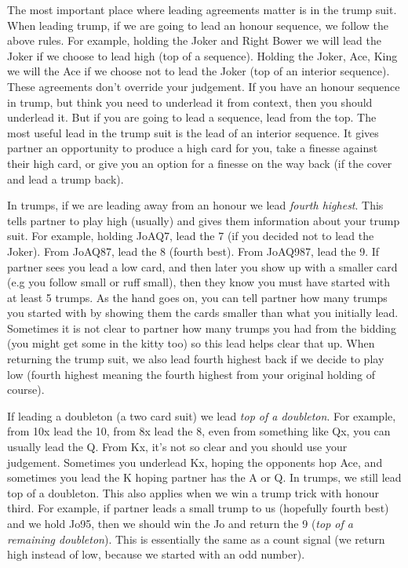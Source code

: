\documentclass[a4paper]{report}
\theoremstyle{question}
\theoremstyle{theorem}
\theoremstyle{definition}
\newcommand{\<}{\left\langle}%
\renewcommand{\>}{\right\rangle}%
\begin{document}
The most important place where leading agreements matter is in the trump suit. When leading trump, if we are going to lead an honour sequence, we follow the above rules. For example, holding the Joker and Right Bower we will lead the Joker if we choose to lead high (top of a sequence). Holding the Joker, Ace, King we will the Ace if we choose not to lead the Joker (top of an interior sequence). These agreements don't override your judgement. If you have an honour sequence in trump, but think you need to underlead it from context, then you should underlead it. But if you are going to lead a sequence, lead from the top. The most useful lead in the trump suit is the lead of an interior sequence. It gives partner an opportunity to produce a high card for you, take a finesse against their high card, or give you an option for a finesse on the way back (if the cover and lead a trump back).


In trumps, if we are leading away from an honour we lead \textit{fourth highest}. This tells partner to play high (usually) and gives them information about your trump suit. For example, holding JoAQ7, lead the 7 (if you decided not to lead the Joker). From JoAQ87, lead the 8 (fourth best). From JoAQ987, lead the 9. If partner sees you lead a low card, and then later you show up with a smaller card (e.g you follow small or ruff small), then they know you must have started with at least 5 trumps. As the hand goes on, you can tell partner how many trumps you started with by showing them the cards smaller than what you initially lead. Sometimes it is not clear to partner how many trumps you had from the bidding (you might get some in the kitty too) so this lead helps clear that up. When returning the trump suit, we also lead fourth highest back if we decide to play low (fourth highest meaning the fourth highest from your original holding of course).

If leading a doubleton (a two card suit) we lead \textit{top of a doubleton}. For example, from 10x lead the 10, from 8x lead the 8, even from something like Qx, you can usually lead the Q. From Kx, it's not so clear and you should use your judgement. Sometimes you underlead Kx, hoping the opponents hop Ace, and sometimes you lead the K hoping partner has the A or Q. In trumps, we still lead top of a doubleton. This also applies when we win a trump trick with honour third. For example, if partner leads a small trump to us (hopefully fourth best) and we hold Jo95, then we should win the Jo and return the 9 (\textit{top of a remaining doubleton}). This is essentially the same as a count signal (we return high instead of low, because we started with an odd number).
\end{document}
